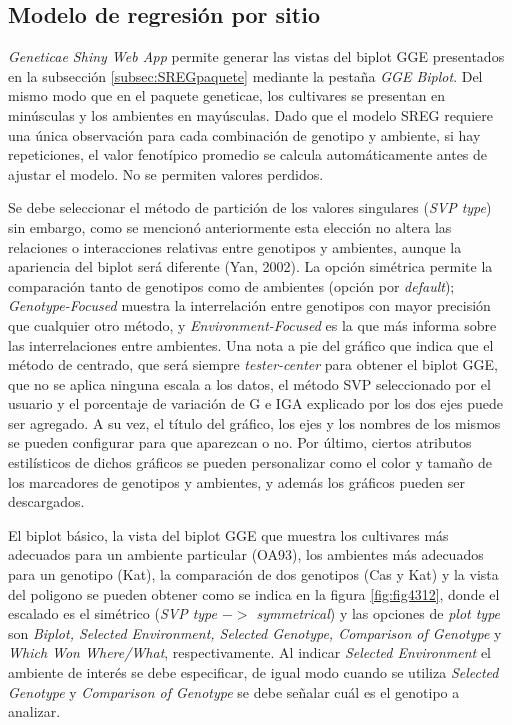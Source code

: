 \subsection{Modelo de regresión por sitio}

\emph{Geneticae Shiny Web App} permite generar las vistas del biplot GGE presentados en la subsección \ref{subsec:SREGpaquete} mediante la pestaña \emph{GGE Biplot}. Del mismo modo que en el paquete geneticae, los cultivares se presentan en minúsculas y los ambientes en mayúsculas. Dado que el modelo SREG requiere una única observación para cada combinación de genotipo y ambiente, si hay repeticiones, el valor fenotípico promedio se calcula automáticamente antes de ajustar el modelo. No se permiten valores perdidos. 

Se debe seleccionar el método de partición de los valores singulares (\emph{SVP type}) sin embargo, como se mencionó anteriormente esta elección no altera las relaciones o interacciones relativas entre genotipos y ambientes, aunque la apariencia del biplot será diferente (Yan, 2002). La opción simétrica permite la comparación tanto de genotipos como de ambientes (opción por \emph{default}); \emph{Genotype-Focused} muestra la interrelación entre genotipos con mayor precisión que cualquier otro método, y \emph{Environment-Focused} es la que más informa sobre las interrelaciones entre ambientes. Una nota a pie del gráfico que indica que el método de centrado, que será siempre \emph{tester-center} para obtener el biplot GGE, que no se aplica ninguna escala a los datos, el método SVP seleccionado por el usuario y el porcentaje de variación de G e IGA explicado por los dos ejes puede ser agregado. A su vez, el título del gráfico, los ejes y los nombres de los mismos se pueden configurar para que aparezcan o no. Por último, ciertos atributos estilísticos de dichos gráficos se pueden personalizar como el color y tamaño de los marcadores de genotipos y ambientes, y además los gráficos pueden ser descargados.  

El biplot básico, la vista del biplot GGE que muestra los cultivares más adecuados para un ambiente particular (OA93), los ambientes más adecuados para un genotipo (Kat), la comparación de dos genotipos (Cas y Kat) y la vista del poligono se pueden obtener como se indica en la figura \ref{fig:fig4312}, donde el escalado es el simétrico (\emph{SVP type $->$ symmetrical}) y las opciones de \emph{plot type} son \emph{Biplot,
Selected Environment, Selected Genotype, Comparison of Genotype} y \emph{Which Won Where/What}, respectivamente. Al indicar \emph{Selected Environment} el ambiente de interés se debe especificar, de igual modo cuando se utiliza \emph{Selected Genotype} y 
\emph{Comparison of Genotype} se debe señalar cuál es el genotipo a analizar.

